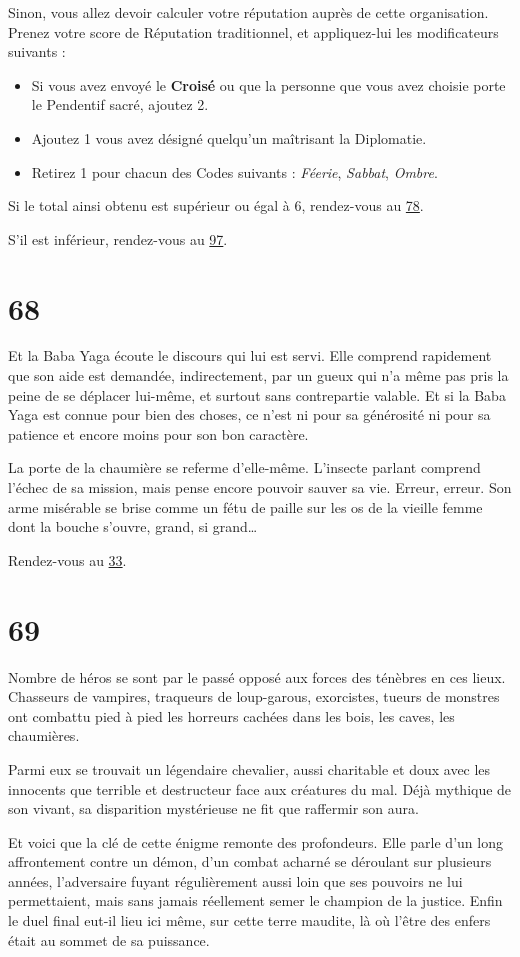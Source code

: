 \documentclass{report}
\newcommand{\gsection}[1]{
    \section{#1}
    \label{section-#1}
}
\newcommand{\glink}[1]{\hyperref[section-#1]{#1}}
\newcommand{\hero}[1]{\textbf{#1}}
\begin{document}
Sinon, vous allez devoir calculer votre réputation auprès de cette organisation. Prenez votre score de Réputation traditionnel, et appliquez-lui les modificateurs suivants :

\begin{itemize}
\item Si vous avez envoyé le \hero{Croisé} ou que la personne que vous avez choisie porte le Pendentif sacré, ajoutez 2.
\item Ajoutez 1 vous avez désigné quelqu'un maîtrisant la Diplomatie.
\item Retirez 1 pour chacun des Codes suivants : \emph{Féerie}, \emph{Sabbat}, \emph{Ombre}.
\end{itemize}

Si le total ainsi obtenu est supérieur ou égal à 6, rendez-vous au \glink{78}.

S'il est inférieur, rendez-vous au \glink{97}.

\gsection{68}

Et la Baba Yaga écoute le discours qui lui est servi. Elle comprend rapidement que son aide est demandée, indirectement, par un gueux qui n'a même pas pris la peine de se déplacer lui-même, et surtout sans contrepartie valable. Et si la Baba Yaga est connue pour bien des choses, ce n'est ni pour sa générosité ni pour sa patience et encore moins pour son bon caractère.

La porte de la chaumière se referme d'elle-même. L'insecte parlant comprend l'échec de sa mission, mais pense encore pouvoir sauver sa vie. Erreur, erreur. Son arme misérable se brise comme un fétu de paille sur les os de la vieille femme dont la bouche s'ouvre, grand, si grand\dots

Rendez-vous au \glink{33}.

\gsection{69}

Nombre de héros se sont par le passé opposé aux forces des ténèbres en ces lieux. Chasseurs de vampires, traqueurs de loup-garous, exorcistes, tueurs de monstres ont combattu pied à pied les horreurs cachées dans les bois, les caves, les chaumières.

Parmi eux se trouvait un légendaire chevalier, aussi charitable et doux avec les innocents que terrible et destructeur face aux créatures du mal. Déjà mythique de son vivant, sa disparition mystérieuse ne fit que raffermir son aura.

Et voici que la clé de cette énigme remonte des profondeurs. Elle parle d'un long affrontement contre un démon, d'un combat acharné se déroulant sur plusieurs années, l'adversaire fuyant régulièrement aussi loin que ses pouvoirs ne lui permettaient, mais sans jamais réellement semer le champion de la justice. Enfin le duel final eut-il lieu ici même, sur cette terre maudite, là où l'être des enfers était au sommet de sa puissance.
\end{document}
